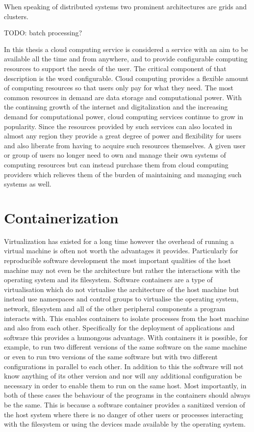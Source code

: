 When speaking of distributed systems two prominent architectures are grids and clusters. 

TODO: batch processing?

In this thesis a cloud computing service is considered a service with an aim to be available all the time and from anywhere, and to provide configurable computing resources to support the needs of the user. The critical component of that description is the word configurable. Cloud computing provides a flexible amount of computing resources so that users only pay for what they need. The most common resources in demand are data storage and computational power. With the continuing growth of the internet and digitalization and the increasing demand for computational power, cloud computing services continue to grow in popularity. Since the resources provided by such services can also located in almost any region they provide a great degree of power and flexibility for users and also liberate from having to acquire such resources themselves. A given user or group of users no longer need to own and manage their own systems of computing resources but can instead purchase them from cloud computing providers which relieves them of the burden of maintaining and managing such systems as well. 


\section{Containerization}
\label{sec:containers}

Virtualization has existed for a long time however the overhead of running a virtual machine is often not worth the advantages it provides. Particularly for reproducible software development the most important qualities of the host machine may not even be the architecture but rather the interactions with the operating system and its filesystem. Software containers are a type of virtualisation which do not virtualise the architecture of the host machine but instead use namespaces and control groups to virtualise the operating system, network, filesystem and all of the other peripheral components a program interacts with. This enables containers to isolate processes from the host machine and also from each other. Specifically for the deployment of applications and software this provides a humongous advantage. With containers it is possible, for example, to run two different versions of the same software on the same machine or even to run two versions of the same software but with two different configurations in parallel to each other. In addition to this the software will not know anything of its other version and nor will any additional configuration be necessary in order to enable them to run on the same host. Most importantly, in both of these cases the behaviour of the programs in the containers should always be the same. This is because a software container provides a sanitized version of the host system where there is no danger of other users or processes interacting with the filesystem or using the devices made available by the operating system.

